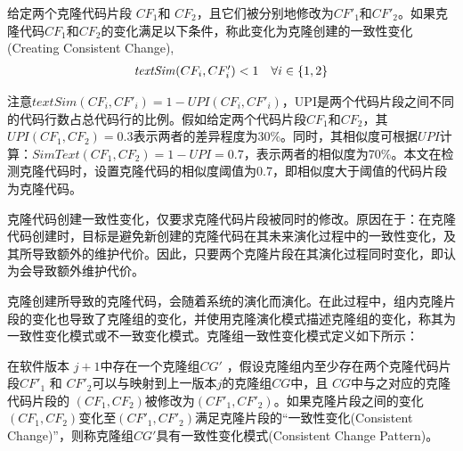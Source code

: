 \begin{definition}[克隆创建一致性变化]  
\label{def-creatingchange}
给定两个克隆代码片段 $CF_1$和 $CF_2$，且它们被分别地修改为$CF'_1$和$CF'_2$。如果克隆代码$CF_1$和$CF_2$的变化满足以下条件，称此变化为克隆创建的一致性变化(Creating Consistent Change), 
  \[
  \begin{array}[t]{cr}
    \mathit{textSim}(CF_i, CF'_i) < 1 & \forall i \in \{1,2\}  \\
  \end{array}
  \]
\end{definition}

注意$\mathit {textSim}(CF_i, CF'_i)= 1 - UPI(CF_i, CF'_i)$，UPI是两个代码片段之间不同的代码行数占总代码行的比例。假如给定两个代码片段$CF_1$和$CF_2$，其$UPI(CF_1,CF_2)=0.3$表示两者的差异程度为30\%。同时，其相似度可根据$UPI$计算：$SimText (CF_1,CF_2)=1-UPI=0.7$，表示两者的相似度为70\%。本文在检测克隆代码时，设置克隆代码的相似度阈值为0.7，即相似度大于阈值的代码片段为克隆代码。%


克隆代码创建一致性变化，仅要求克隆代码片段被同时的修改。原因在于：在克隆代码创建时，目标是避免新创建的克隆代码在其未来演化过程中的一致性变化，及其所导致额外的维护代价。因此，只要两个克隆片段在其演化过程同时变化，即认为会导致额外维护代价。

克隆创建所导致的克隆代码，会随着系统的演化而演化。在此过程中，组内克隆片段的变化也导致了克隆组的变化，并使用克隆演化模式描述克隆组的变化，称其为一致性变化模式或不一致变化模式。克隆组一致性变化模式定义如下所示：

\begin{definition}[创建一致性变化模式] 
\label{def-creatingpattern}
在软件版本 $j+1$中存在一个克隆组$CG'$ ，假设克隆组内至少存在两个克隆代码片段$CF'_1$ 和 $CF'_2$可以与映射到上一版本$j$的克隆组$CG$中，且 $CG$中与之对应的克隆代码片段的 $(CF_1,CF_2)$被修改为$(CF'_1,CF'_2)$。如果克隆片段之间的变化$(CF_1,CF_2)$变化至$(CF'_1,CF'_2)$满足克隆片段的“一致性变化(Consistent Change)”，则称克隆组$CG'$具有一致性变化模式(Consistent Change Pattern)。
\end{definition}

